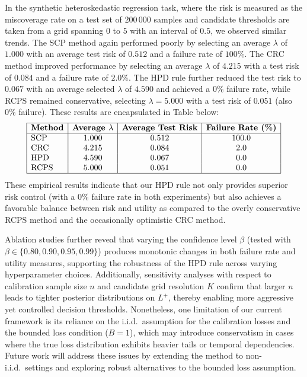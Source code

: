 \documentclass{article} %
\begin{document}
In the synthetic heteroskedastic regression task, where the risk is measured as the miscoverage rate on a test set of \(200\,000\) samples and candidate thresholds are taken from a grid spanning \(0\) to \(5\) with an interval of \(0.5\), we observed similar trends. The SCP method again performed poorly by selecting an average \(\lambda\) of \(1.000\) with an average test risk of \(0.512\) and a failure rate of \(100\%\). The CRC method improved performance by selecting an average \(\lambda\) of \(4.215\) with a test risk of \(0.084\) and a failure rate of \(2.0\%\). The HPD rule further reduced the test risk to \(0.067\) with an average selected \(\lambda\) of \(4.590\) and achieved a \(0\%\) failure rate, while RCPS remained conservative, selecting \(\lambda = 5.000\) with a test risk of \(0.051\) (also \(0\%\) failure). These results are encapsulated in Table below:
\[
\begin{array}{|l|c|c|c|}
\hline
\textbf{Method} & \textbf{Average } \lambda & \textbf{Average Test Risk} & \textbf{Failure Rate (\%)} \\
\hline
\text{SCP} & 1.000 & 0.512 & 100.0 \\
\text{CRC} & 4.215 & 0.084 & 2.0 \\
\text{HPD} & 4.590 & 0.067 & 0.0 \\
\text{RCPS} & 5.000 & 0.051 & 0.0 \\
\hline
\end{array}
\]
These empirical results indicate that our HPD rule not only provides superior risk control (with a \(0\%\) failure rate in both experiments) but also achieves a favorable balance between risk and utility as compared to the overly conservative RCPS method and the occasionally optimistic CRC method.

Ablation studies further reveal that varying the confidence level \(\beta\) (tested with \(\beta \in \{0.80, 0.90, 0.95, 0.99\}\)) produces monotonic changes in both failure rate and utility measures, supporting the robustness of the HPD rule across varying hyperparameter choices. Additionally, sensitivity analyses with respect to calibration sample size \(n\) and candidate grid resolution \(K\) confirm that larger \(n\) leads to tighter posterior distributions on \(L^+\), thereby enabling more aggressive yet controlled decision thresholds. Nonetheless, one limitation of our current framework is its reliance on the i.i.d.\ assumption for the calibration losses and the bounded loss condition (\(B=1\)), which may introduce conservatism in cases where the true loss distribution exhibits heavier tails or temporal dependencies. Future work will address these issues by extending the method to non-i.i.d.\ settings and exploring robust alternatives to the bounded loss assumption.
\end{document}
